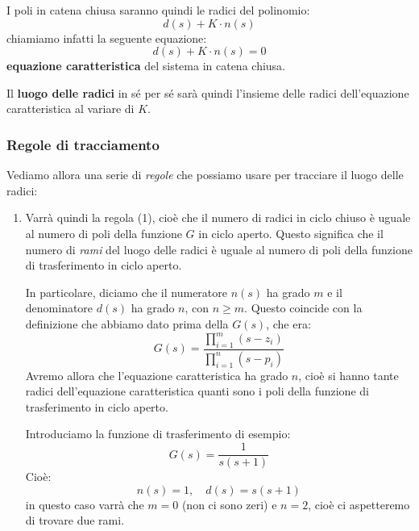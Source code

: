 \documentclass[a4paper,11pt]{article}
\begin{document}
I poli in catena chiusa saranno quindi le radici del polinomio:
$$
d(s) + K \cdot n(s)
$$
chiamiamo infatti la seguente equazione:
$$
d(s) + K \cdot n(s) = 0
$$
\textbf{equazione caratteristica} del sistema in catena chiusa.

Il \textbf{luogo delle radici} in sé per sé sarà quindi l'insieme delle radici dell'equazione caratteristica al variare di $K$.

\subsubsection{Regole di tracciamento}
Vediamo allora una serie di \textit{regole} che possiamo usare per tracciare il luogo delle radici:

\begin{enumerate}
	\item 
		Varrà quindi la regola (1), cioè che il numero di radici in ciclo chiuso è uguale al numero di poli della funzione $G$ in ciclo aperto.
		Questo significa che il numero di \textit{rami} del luogo delle radici è uguale al numero di poli della funzione di trasferimento in ciclo aperto.

		In particolare, diciamo che il numeratore $n(s)$ ha grado $m$ e il denominatore $d(s)$ ha grado $n$, con $n \geq m$.
		Questo coincide con la definizione che abbiamo dato prima della $G(s)$, che era:
		$$
		G(s) = \frac{\prod_{i = 1}^m (s - z_i)}{\prod_{i = 1}^n (s - p_i)}
		$$
		Avremo allora che l'equazione caratteristica ha grado $n$, cioè si hanno tante radici dell'equazione caratteristica quanti sono i poli della funzione di trasferimento in ciclo aperto.

		\par\medskip
		\noindent
		\textbf{}

		Introduciamo la funzione di trasferimento di esempio:
		$$
		G(s) = \frac{1}{s (s + 1)}
		$$
		Cioè:
		$$
		n(s) = 1, \quad d(s) = s(s + 1)
		$$
		in questo caso varrà che $m = 0$ (non ci sono zeri) e $n = 2$, cioè ci aspetteremo di trovare due rami.


\end{enumerate}
\end{document}
